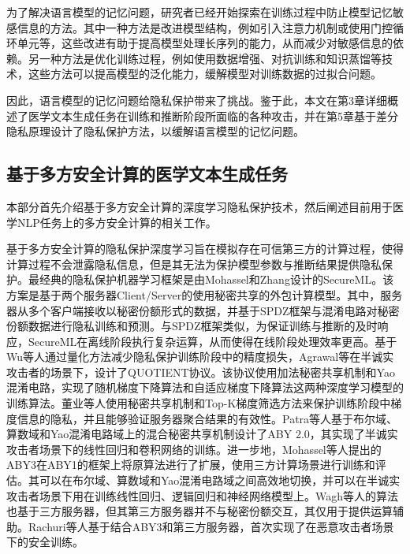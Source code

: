 为了解决语言模型的记忆问题，研究者已经开始探索在训练过程中防止模型记忆敏感信息的方法。其中一种方法是改进模型结构，例如引入注意力机制或使用门控循环单元等，这些改进有助于提高模型处理长序列的能力，从而减少对敏感信息的依赖。另一种方法是优化训练过程，例如使用数据增强、对抗训练和知识蒸馏等技术，这些方法可以提高模型的泛化能力，缓解模型对训练数据的过拟合问题。


因此，语言模型的记忆问题给隐私保护带来了挑战。鉴于此，本文在第3章详细概述了医学文本生成任务在训练和推断阶段所面临的各种攻击，并在第5章基于差分隐私原理设计了隐私保护方法，以缓解语言模型的记忆问题。



\subsection{基于多方安全计算的医学文本生成任务}

本部分首先介绍基于多方安全计算的深度学习隐私保护技术，然后阐述目前用于医学NLP任务上的多方安全计算的相关工作。

基于多方安全计算的隐私保护深度学习旨在模拟存在可信第三方的计算过程，使得计算过程不会泄露隐私信息，但是其无法为保护模型参数与推断结果提供隐私保护。最经典的隐私保护机器学习框架是由Mohassel和Zhang设计的SecureML\cite{secureml}。该方案是基于两个服务器Client/Server的使用秘密共享的外包计算模型。其中，服务器从多个客户端接收以秘密份额形式的数据，并基于SPDZ框架\cite{spd}与混淆电路对秘密份额数据进行隐私训练和预测。与SPDZ框架类似，为保证训练与推断的及时响应，SecureML在离线阶段执行复杂运算，从而使得在线阶段处理效率更高。基于Wu等人\cite{wu2018training}通过量化方法减少隐私保护训练阶段中的精度损失，Agrawal等\cite{agrawal2019quotient}在半诚实攻击者的场景下，设计了QUOTIENT协议。该协议使用加法秘密共享机制和Yao混淆电路，实现了随机梯度下降算法和自适应梯度下降算法这两种深度学习模型的训练算法。董业等人\cite{FLSSGS}使用秘密共享机制和Top-K梯度筛选方法来保护训练阶段中梯度信息的隐私，并且能够验证服务器聚合结果的有效性。Patra等人\cite{patra2021aby2}基于布尔域、算数域和Yao混淆电路域上的混合秘密共享机制设计了ABY 2.0，其实现了半诚实攻击者场景下的线性回归和卷积网络的训练。进一步地，Mohassel\cite{mohassel2018aby3}等人提出的ABY3在ABY1\cite{demmler2015aby}的框架上将原算法进行了扩展，使用三方计算场景进行训练和评估。其可以在布尔域、算数域和Yao混淆电路域之间高效地切换，并可以在半诚实攻击者场景下用在训练线性回归、逻辑回归和神经网络模型上。Wagh等人\cite{SecureNN}的算法也基于三方服务器，但其第三方服务器并不与秘密份额交互，其仅用于提供运算辅助。Rachuri等人\cite{chaudhari2019trident}基于结合ABY3和第三方服务器，首次实现了在恶意攻击者场景下的安全训练。

